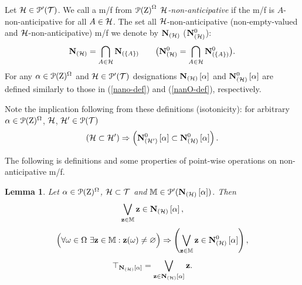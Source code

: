 \documentclass[sn-mathphys,Numbered,pdflatex]{sn-jnl}%
\theoremstyle{thmstyleone}%
\theoremstyle{thmstyletwo}%
\theoremstyle{thmstylethree}%
\newtheorem{lem}{Lemma}
\newcommand{\beq}{\begin{equation}}
\newcommand{\eeq}{\end{equation}}
\newcommand{\mydef}{\mathrel{\triangleq}}%
\newcommand{\icP}[1]{\EuScript{P}({#1})}%
\newcommand{\icPp}[1]{\EuScript{P^\prime}({#1})}%
\newcommand{\myll}{\ensuremath{\forall}}%
\newcommand{\myimp}{\ensuremath{\mathrel{\Rightarrow}}}%
\newcommand{\myemp}{\ensuremath{\varnothing}}%
\newcommand{\myxst}{\ensuremath{\exists}}%
\newcommand{\myLe}{\mathrel{\sqsubseteq}}%
\newcommand{\naOm}{\ensuremath{\Omega}}%
\newcommand{\naZ}{\ensuremath{\mathrm{Z}}}%
\newcommand{\naTc}{\ensuremath{\mathcal{T}}}%
\newcommand{\AnaN}[2]{\mathbf{N}_{(#1)}\setbox0=\hbox{\text{$#2$}}\ifdim\wd0=0pt\else\left[{#2}\right]\fi}%
\newcommand{\AnaNO}[2]{\mathbf{N}^0_{(#1)}\setbox0=\hbox{\text{$#2$}}\ifdim\wd0=0pt\else\left[{#2}\right]\fi}%
\newcommand{\fref}[1]{{\rm(\ref{#1})}}   %
\begin{document}
Let ${\cal H}\in\icPp\naTc$.
We call a m/f from ${\icP\naZ}^\naOm$ \emph{${\cal H}$-non-anticipative} if the m/f is $A$-non-anticipative for all $A\in{\cal H}$.
The set all ${\cal H}$-non-anticipative (non-empty-valued and ${\cal H}$-non-anticipative) m/f we denote by $\AnaN{\cal H}{ }$ ($\AnaNO{\cal H}{}$):
$$
\AnaN{\cal H}{}=\bigcap_{A\in{\cal H}}\AnaN{\{A\}}{}\qquad\bigl( \AnaNO{\cal H}{}=\bigcap_{A\in{\cal H}}\AnaNO{\{A\}}{}\bigr).
$$
For any $\alpha\in\icP\naZ^\naOm$ and ${\cal H}\in\icPp\naTc$ designations $\AnaN{\cal H}\alpha$ and $\AnaNO{\cal H}\alpha$  are defined similarly to those in \fref{nano-def} and \fref{nanO-def}, respectively.

Note the implication following from these definitions (isotonicity):
for arbitrary $\alpha\in\icP\naZ^\naOm$, ${\cal H}$, ${\cal H'}\in\icP\naTc$
\beq\label{A-nan-isot-H}
\left({\cal H}\subset{\cal H'}\right)\myimp\left(\AnaNO{\cal H'}{\alpha}\subset\AnaNO{\cal H}{\alpha}\right).
\eeq

The following is definitions and some properties of point-wise operations on non-anticipative m/f.
\begin{lem}\label{lem-AnaUI-Ana}
Let $\alpha\in\icP\naZ^\naOm$, ${\cal H}\subset\naTc$ and $\mathbb{M}\in\icPp{\AnaN{\cal H}\alpha}$.
Then
\beq\label{AnaUI-Ana}
\bigvee_{{\bf z}\in\mathbb{M}}{\bf z}\in\AnaN{\cal H}\alpha,
\eeq
\beq\label{zom-nem-ANo-nem}
\Bigl(\myll\omega\in\naOm\ \myxst{\bf z}\in\mathbb{M}: {\bf z}(\omega)\neq\myemp\Bigr)\myimp\left(\bigvee_ {{\bf z}\in\mathbb{M}}{\bf z}\in\AnaNO{\cal H}\alpha\right),
\eeq
\beq\label{def-Ana-al}
\top_{\AnaN{\cal H}\alpha}=\bigvee_{{\bf z}\in\AnaN{\cal H}\alpha}{\bf z}.
\eeq
\end{lem}
\end{document}

